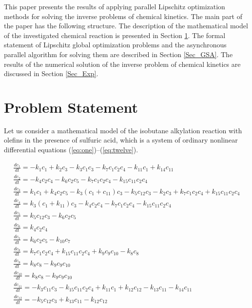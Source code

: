 \documentclass{svproc}
\begin{document}
This paper presents the results of applying parallel Lipschitz optimization methods for solving the inverse problems of chemical kinetics. The main part of the paper has the following structure. The description of the mathematical model of the investigated chemical reaction is presented in Section \ref{Sec_math_mod}. The formal statement of Lipschitz global optimization problems and the asynchronous parallel algorithm for solving them are described in Section \ref{Sec_GSA}. The results of the numerical solution of the inverse problem of chemical kinetics are discussed in Section \ref{Sec_Exp}.

\section{Problem Statement}\label{Sec_math_mod}

Let us consider a mathematical model of the isobutane alkylation reaction with olefins in the presence of sulfuric acid, which is a system of ordinary nonlinear differential equations (\ref{eq:one})--(\ref{eq:twelve}).

\begin{gather}
  \frac{dc_1}{dt} = -k_1c_1 + k_2c_3 - k_3c_1c_3 - k_7c_1c_2c_4 - k_{11}c_1 + k_{14}c_{11} \label{eq:one} \\
  \frac{dc_2}{dt} = -k_4c_2c_4 - k_6c_2c_5 - k_7c_1c_2c_4 - k_{15}c_{11}c_2c_4 \label{eq:two} \\
  \frac{dc_3}{dt} = k_1c_1 + k_4c_2c_5 - k_3(c_1 + c_{11})c_3 - k_{5}c_{12}c_3 - k_2c_3 + k_7c_1c_2c_4 + k_{15}c_{11}c_2c_4 \label{eq:three} \\
  \frac{dc_4}{dt} = k_3(c_1 + k_{11})c_3 - k_4c_2c_4 - k_{7}c_{1}c_2c_4 - k_{15}c_{11}c_2c_4 \label{eq:four} \\
  \frac{dc_5}{dt} = k_5c_{12}c_3 - k_{6}c_2c_5 \label{eq:five} \\
  \frac{dc_6}{dt} = k_4c_{2}c_4 \label{eq:six} \\
  \frac{dc_7}{dt} = k_6c_{2}c_5 - k_{10}c_7 \label{eq:seven} \\
  \frac{dc_8}{dt} = k_7c_{1}c_2c_4 + k_{15}c_{11}c_2c_4 + k_9c_9c_{10} - k_8c_8 \label{eq:eight} \\
  \frac{dc_9}{dt} = k_8c_{8} - k_{9}c_{9}c_{10} \label{eq:nine} \\
  \frac{dc_{10}}{dt} = k_8c_{8} - k_{9}c_{9}c_{10} \label{eq:ten} \\
  \frac{dc_{11}}{dt} = -k_3c_{11}c_3 - k_{15}c_{11}c_{2}c_4 + k_{11}c_1 + k_{12}c_{12} - k_{13}c_{11} - k_{14}c_{11} \label{eq:eleven} \\
  \frac{dc_{12}}{dt} = -k_5c_{12}c_3 + k_{13}c_{11} - k_{12}c_{12} \label{eq:twelve} 
\end{gather}
\end{document}
